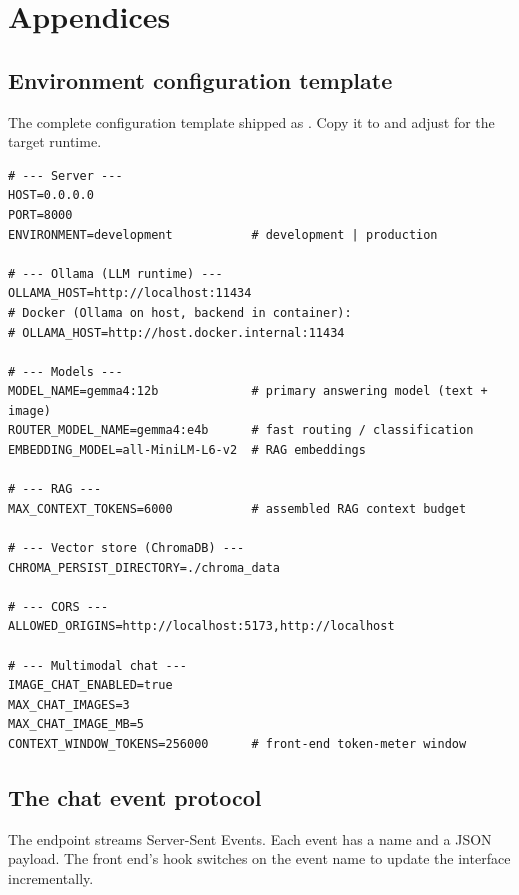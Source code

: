 \chapter{Appendices}
\label{ch:appendix}

\section{Environment configuration template}
\label{app:env}
The complete configuration template shipped as . Copy it to
 and adjust for the target runtime.

\begin{lstlisting}[style=bash,caption={\code{.env.example} (annotated).}]
# --- Server ---
HOST=0.0.0.0
PORT=8000
ENVIRONMENT=development           # development | production

# --- Ollama (LLM runtime) ---
OLLAMA_HOST=http://localhost:11434
# Docker (Ollama on host, backend in container):
# OLLAMA_HOST=http://host.docker.internal:11434

# --- Models ---
MODEL_NAME=gemma4:12b             # primary answering model (text + image)
ROUTER_MODEL_NAME=gemma4:e4b      # fast routing / classification
EMBEDDING_MODEL=all-MiniLM-L6-v2  # RAG embeddings

# --- RAG ---
MAX_CONTEXT_TOKENS=6000           # assembled RAG context budget

# --- Vector store (ChromaDB) ---
CHROMA_PERSIST_DIRECTORY=./chroma_data

# --- CORS ---
ALLOWED_ORIGINS=http://localhost:5173,http://localhost

# --- Multimodal chat ---
IMAGE_CHAT_ENABLED=true
MAX_CHAT_IMAGES=3
MAX_CHAT_IMAGE_MB=5
CONTEXT_WINDOW_TOKENS=256000      # front-end token-meter window
\end{lstlisting}

\section{The chat event protocol}
\label{app:events}
The  endpoint streams Server-Sent Events. Each event has a name and a
JSON  payload. The front end's  hook switches on the
event name to update the interface incrementally.

